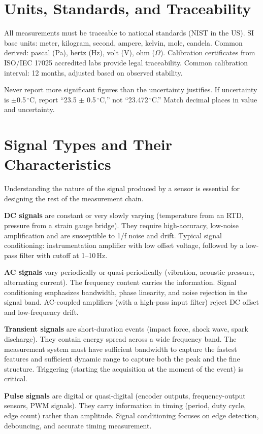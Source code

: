 \documentclass[11pt,letterpaper,twoside,openany]{book}
\newcommand{\degC}{\ensuremath{{}^{\circ}\text{C}}}
\begin{document}
\section{Units, Standards, and Traceability}
All measurements must be traceable to national standards (NIST in the US). SI base units: meter, kilogram, second, ampere, kelvin, mole, candela. Common derived: pascal (Pa), hertz (Hz), volt (V), ohm ($\Omega$). Calibration certificates from ISO/IEC 17025 accredited labs provide legal traceability. Common calibration interval: 12 months, adjusted based on observed stability.

\begin{warningbox}
Never report more significant figures than the uncertainty justifies. If uncertainty is $\pm$0.5\,\degC{}, report ``23.5 $\pm$ 0.5\,\degC{},'' not ``23.472\,\degC{}.'' Match decimal places in value and uncertainty.
\end{warningbox}
\section{Signal Types and Their Characteristics}
Understanding the nature of the signal produced by a sensor is essential for designing the rest of the measurement chain.

\textbf{DC signals} are constant or very slowly varying (temperature from an RTD, pressure from a strain gauge bridge). They require high-accuracy, low-noise amplification and are susceptible to 1/f noise and drift. Typical signal conditioning: instrumentation amplifier with low offset voltage, followed by a low-pass filter with cutoff at 1--10\,Hz.

\textbf{AC signals} vary periodically or quasi-periodically (vibration, acoustic pressure, alternating current). The frequency content carries the information. Signal conditioning emphasizes bandwidth, phase linearity, and noise rejection in the signal band. AC-coupled amplifiers (with a high-pass input filter) reject DC offset and low-frequency drift.

\textbf{Transient signals} are short-duration events (impact force, shock wave, spark discharge). They contain energy spread across a wide frequency band. The measurement system must have sufficient bandwidth to capture the fastest features and sufficient dynamic range to capture both the peak and the fine structure. Triggering (starting the acquisition at the moment of the event) is critical.

\textbf{Pulse signals} are digital or quasi-digital (encoder outputs, frequency-output sensors, PWM signals). They carry information in timing (period, duty cycle, edge count) rather than amplitude. Signal conditioning focuses on edge detection, debouncing, and accurate timing measurement.
\end{document}
